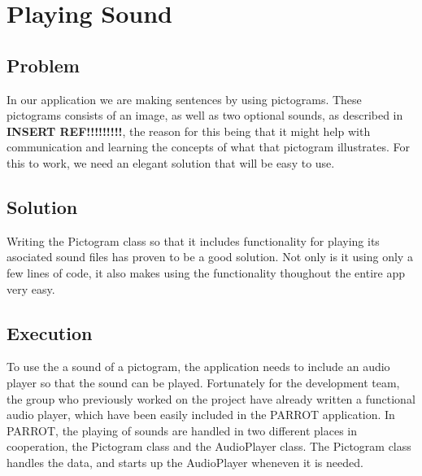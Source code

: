 \section{Playing Sound}
\subsection{Problem}
In our application we are making sentences by using pictograms. These pictograms consists of an image, as well as two optional sounds, as described in \textbf{INSERT REF!!!!!!!!!}, the reason for this being that it might help with communication and learning the concepts of what that pictogram illustrates.\newline
For this to work, we need an elegant solution that will be easy to use.

\subsection{Solution}
Writing the Pictogram class so that it includes functionality for playing its asociated sound files has proven to be a good solution. Not only is it using only a few lines of code, it also makes using the functionality thoughout the entire app very easy.

\subsection{Execution}
To use the a sound of a pictogram, the application needs to include an audio player so that the sound can be played. Fortunately for the development team, the group who previously worked on the project have already written a functional audio player, which have been easily included in the PARROT application.\newline
In PARROT, the playing of sounds are handled in two different places in cooperation, the Pictogram class and the AudioPlayer class.\newline
The Pictogram class handles the data, and starts up the AudioPlayer wheneven it is needed.\newline

